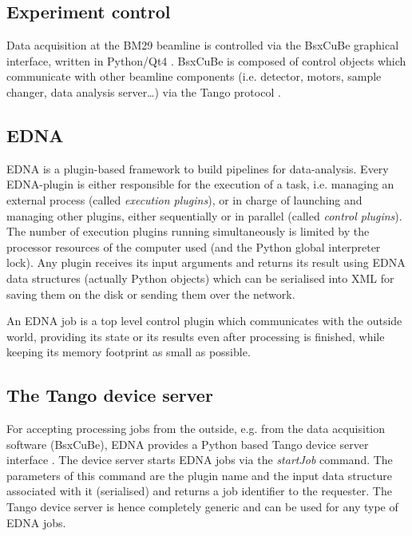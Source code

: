 \documentclass[preprint,pdf]{iucr}              %
\begin{document}
\subsection{Experiment control}
Data acquisition at the BM29 beamline is controlled via the BsxCuBe
graphical interface, written in Python/Qt4 \cite{pyqt}.
BsxCuBe is composed of control objects which communicate with other beamline
components (i.e. detector, motors, sample changer, data analysis server\ldots)
via the Tango protocol \cite{tango}.




\subsection{EDNA}
EDNA \cite{EDNA} is a plugin-based framework to build pipelines for data-analysis.
Every EDNA-plugin is either responsible
for the execution of a task, i.e. managing an external process
(called \textit{execution plugins}), or in charge of launching and managing
other plugins, either sequentially or in parallel (called \textit{control plugins}).
The number of execution plugins running simultaneously is limited by the
processor resources of the computer used (and the Python global interpreter
lock).
Any plugin receives its input arguments and returns its result using
EDNA data structures (actually Python objects) which can be serialised into XML
for saving them on the disk or sending them over the network.

An EDNA job is a top level control plugin which communicates with the outside
world, providing its state or its results even after processing is finished,
while keeping its memory footprint as small as possible.

\subsection{The Tango device server}
For accepting processing jobs from the outside, e.g. from the data
acquisition software (BsxCuBe), EDNA provides a Python based Tango device
server interface \cite{tango,pytango}.
The device server starts EDNA jobs via the \textit{startJob} command.
The parameters of this command are the plugin name and the input data structure
associated with it (serialised) and returns a job identifier to the requester.
The Tango device server is hence completely generic and can be used for any
type of EDNA jobs.
\end{document}
